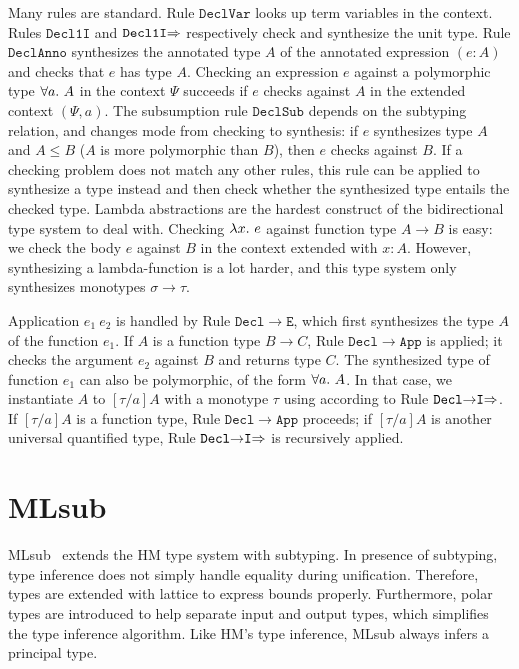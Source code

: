 Many rules are standard.
Rule $\mathtt{DeclVar}$ looks up term variables in the context.
Rules $\mathtt{Decl1I}$ and $\mathtt{Decl1I{\Rightarrow}}$ respectively check and synthesize the unit type.
Rule $\mathtt{DeclAnno}$ synthesizes the annotated type $A$ of the annotated expression $(e:A)$
and checks that $e$ has type $A$.
Checking an expression $e$ against a polymorphic type $\all A$ in the context $\Psi$ succeeds
if $e$ checks against $A$ in the extended context $(\Psi, a)$.
The subsumption rule $\mathtt{DeclSub}$ depends on the subtyping relation,
and changes mode from checking to synthesis: if $e$ synthesizes type $A$ and $A\le B$
($A$ is more polymorphic than $B$), then $e$ checks against $B$.
If a checking problem does not match any other rules,
this rule can be applied to synthesize a type instead and then
check whether the synthesized type entails the checked type.
Lambda abstractions are the hardest construct of the bidirectional
type system to deal with. 
Checking $\lam e$ against function type $A\to B$ is easy:
we check the body $e$ against $B$ in the context extended with $x:A$.
However, synthesizing a lambda-function is a lot harder, and 
this type system only synthesizes monotypes $\sigma\to\tau$.

Application $e_1~e_2$ is handled by Rule $\mathtt{Decl{\to}E}$,
which first synthesizes the type $A$ of the function $e_1$.
If $A$ is a function type $B\to C$, Rule $\mathtt{Decl{\to}App}$ is applied;
it checks the argument $e_2$ against $B$ and returns type $C$.
The synthesized type of function $e_1$ can also be polymorphic, of the form $\all A$.
In that case, we instantiate $A$ to $[\tau/a]A$ with a monotype $\tau$ %
using according to Rule $\mathtt{Decl{\to}I{\Rightarrow}}$.
If $[\tau/a]A$ is a function type, Rule $\mathtt{Decl{\to}App}$ proceeds;
if $[\tau/a]A$ is another universal quantified type,
Rule $\mathtt{Decl{\to}I{\Rightarrow}}$ is recursively applied.




\section{MLsub}

MLsub~\cite{mlsub} extends the HM type system with subtyping.
In presence of subtyping, type inference does not simply handle equality during unification.
Therefore, types are extended with lattice to express bounds properly.
Furthermore, polar types are introduced to help separate input and output types,
which simplifies the type inference algorithm.
Like HM's type inference, MLsub always infers a principal type.

